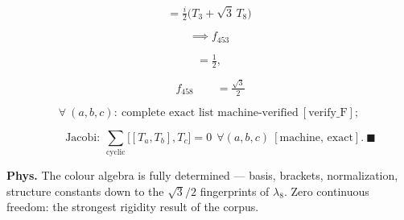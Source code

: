 \begin{theorem}
\[
= \tfrac i2\bigl(T_3+\sqrt3\,T_8\bigr)
\]

\[
\implies f_{453}
\]

\[
= \tfrac12,
\]

\[
\ f_{458}\qquad = \tfrac{\sqrt3}2
\]

\[
\forall\ (a,b,c):\ \text{complete exact list machine-verified}\ [\text{verify\_F}];
\]

\[
\qquad \text{Jacobi}:\ \sum_{\mathrm{cyclic}}\bigl[[T_a,T_b],T_c\bigr]=0\ \ \forall(a,b,c)\ [\text{machine, exact}].\ \blacksquare
\]

\textbf{Phys.} The colour algebra is fully determined — basis, brackets, normalization, structure constants down to the $\sqrt3/2$ fingerprints of $\lambda_8$. Zero continuous freedom: the strongest rigidity result of the corpus.

\end{theorem}


